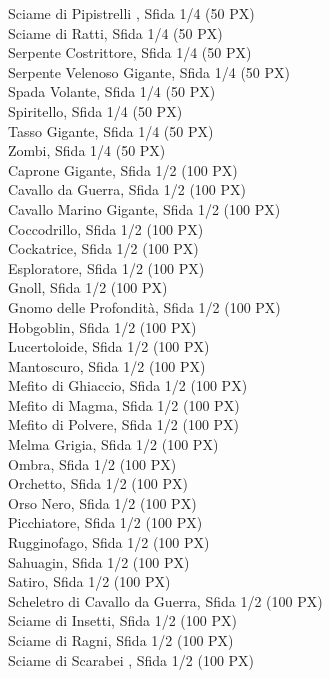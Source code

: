 \begin{multicols}{3}
{		Sciame di Pipistrelli  , Sfida 1/4 (50 PX)\\
		Sciame di Ratti, Sfida 1/4 (50 PX)\\
		Serpente Costrittore, Sfida 1/4 (50 PX)\\
		Serpente Velenoso Gigante, Sfida 1/4 (50 PX)\\
		Spada Volante, Sfida 1/4 (50 PX)\\
		Spiritello, Sfida 1/4 (50 PX)\\
		Tasso Gigante, Sfida 1/4 (50 PX)\\
		Zombi, Sfida 1/4 (50 PX)\\
		Caprone Gigante, Sfida 1/2 (100 PX)\\
		Cavallo da Guerra, Sfida 1/2 (100 PX)\\
		Cavallo Marino Gigante, Sfida 1/2 (100 PX)\\
		Coccodrillo, Sfida 1/2 (100 PX)\\
		Cockatrice, Sfida 1/2 (100 PX)\\
		Esploratore, Sfida 1/2 (100 PX)\\
		Gnoll, Sfida 1/2 (100 PX)\\
		Gnomo delle Profondità, Sfida 1/2 (100 PX)\\
		Hobgoblin, Sfida 1/2 (100 PX)\\
		Lucertoloide, Sfida 1/2 (100 PX)\\
		Mantoscuro, Sfida 1/2 (100 PX)\\
		Mefito di Ghiaccio, Sfida 1/2 (100 PX)\\
		Mefito di Magma, Sfida 1/2 (100 PX)\\
		Mefito di Polvere, Sfida 1/2 (100 PX)\\
		Melma Grigia, Sfida 1/2 (100 PX)\\
		Ombra, Sfida 1/2 (100 PX)\\
		Orchetto, Sfida 1/2 (100 PX)\\
		Orso Nero, Sfida 1/2 (100 PX)\\
		Picchiatore, Sfida 1/2 (100 PX)\\
		Rugginofago, Sfida 1/2 (100 PX)\\
		Sahuagin, Sfida 1/2 (100 PX)\\
		Satiro, Sfida 1/2 (100 PX)\\
		Scheletro di Cavallo da Guerra, Sfida 1/2 (100 PX)\\
		Sciame di Insetti, Sfida 1/2 (100 PX)\\
		Sciame di Ragni, Sfida 1/2 (100 PX)\\
		Sciame di Scarabei  , Sfida 1/2 (100 PX)\\
}
\end{multicols}
